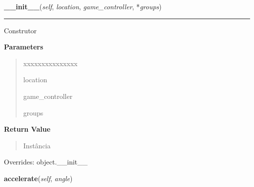     \vspace{0.5ex}

\hspace{.8\funcindent}\begin{boxedminipage}{\funcwidth}

    \raggedright \textbf{\_\_init\_\_}(\textit{self}, \textit{location}, \textit{game\_controller}, *\textit{groups})

    \vspace{-1.5ex}

    \rule{\textwidth}{0.5\fboxrule}
\setlength{\parskip}{2ex}
    Construtor

\setlength{\parskip}{1ex}
      \textbf{Parameters}
      \vspace{-1ex}

      \begin{quote}
        \begin{Ventry}{xxxxxxxxxxxxxxx}

          \item[location]

          \item[game\_controller]

          \item[groups]

        \end{Ventry}

      \end{quote}

      \textbf{Return Value}
    \vspace{-1ex}

      \begin{quote}
      Instância

      \end{quote}

      Overrides: object.\_\_init\_\_

    \end{boxedminipage}

    \label{pygame-asteroids:ship:Ship:accelerate}

    \vspace{0.5ex}

\hspace{.8\funcindent}\begin{boxedminipage}{\funcwidth}

    \raggedright \textbf{accelerate}(\textit{self}, \textit{angle})

\setlength{\parskip}{2ex}
\setlength{\parskip}{1ex}
    \end{boxedminipage}

